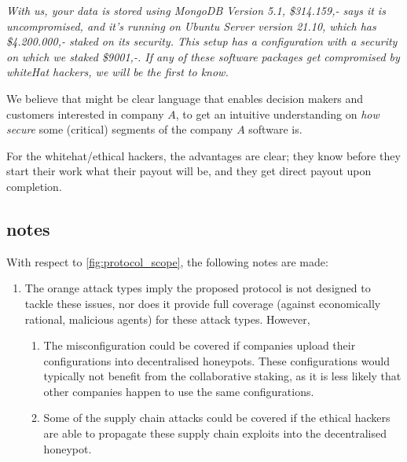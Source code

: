 \textit{With us, your data is stored using MongoDB Version 5.1, \$314.159,- says it is uncompromised, and it's running on Ubuntu Server version 21.10, which has \$4.200.000,- staked on its security. This setup has a configuration with a security on which we staked \$9001,-. If any of these software packages get compromised by whiteHat hackers, we will be the first to know.}

We believe that might be clear language that enables decision makers and customers interested in company $A$, to get an intuitive understanding on \textit{how secure} some (critical) segments of the company $A$ software is.

For the whitehat/ethical hackers, the advantages are clear; they know before they start their work what their payout will be, and they get direct payout upon completion.

\subsection{ notes}
With respect to \cref{fig:protocol_scope}, the following notes are made:
\begin{enumerate} 
    \item The orange attack types imply the proposed protocol is not designed to tackle these issues, nor does it provide full coverage (against economically rational, malicious agents) for these attack types. However,
    \begin{enumerate}
        \item The misconfiguration could be covered if companies upload their configurations into decentralised honeypots. These configurations would typically not benefit from the collaborative staking, as it is less likely that other companies happen to use the same configurations.
        \item Some of the supply chain attacks could be covered if the ethical hackers are able to propagate these supply chain exploits into the decentralised honeypot.
    \end{enumerate}
\end{enumerate}

